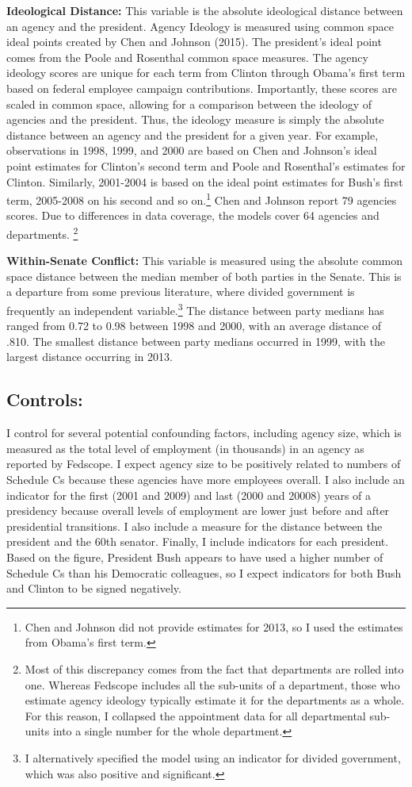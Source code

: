 \documentclass[12pt]{article}
\begin{document}
\textbf{Ideological Distance:} This variable is the absolute ideological distance between an agency and the president. Agency Ideology is measured using common space ideal points created by Chen and Johnson (2015). The president's ideal point comes from the Poole and Rosenthal common space measures. The agency ideology scores are unique for each term from Clinton through Obama's first term based on federal employee campaign contributions. Importantly, these scores are scaled in common space, allowing for a comparison between the ideology of agencies and the president. Thus, the ideology measure is simply the absolute distance between an agency and the president for a given year. For example, observations in 1998, 1999, and 2000 are based on Chen and Johnson's ideal point estimates for Clinton's second term and Poole and Rosenthal's estimates for Clinton. Similarly, 2001-2004 is based on the ideal point estimates for Bush's first term, 2005-2008 on his second and so on.\footnote{Chen and Johnson did not provide estimates for 2013, so I used the estimates from Obama's first term.} Chen and Johnson report 79 agencies scores. Due to differences in data coverage, the models cover 64 agencies and departments. \footnote{Most of this discrepancy comes from the fact that departments are rolled into one. Whereas Fedscope includes all the sub-units of a department, those who estimate agency ideology typically estimate it for the departments as a whole. For this reason, I collapsed the appointment data for all departmental sub-units into a single number for the whole department.}

\noindent \textbf{Within-Senate Conflict:} This variable is measured using the absolute common space distance between the median member of both parties in the Senate. This is a departure from some previous literature, where divided government is frequently an independent variable.\footnote{I alternatively specified the model using an indicator for divided government, which was also positive and significant.} The distance between party medians has ranged from 0.72 to 0.98 between 1998 and 2000, with an average distance of .810. The smallest distance between party medians occurred in 1999, with the largest distance occurring in 2013. 

\subsection*{Controls:}
I control for several potential confounding factors, including agency size, which is measured as the total level of employment (in thousands) in an agency as reported by Fedscope. I expect agency size to be positively related to numbers of Schedule Cs because these agencies have more employees overall. I also include an indicator for the first (2001 and 2009) and last (2000 and 20008) years of a presidency because overall levels of employment are lower just before and after presidential transitions. I also include a measure for the distance between the president and the 60th senator. Finally, I include indicators for each president. Based on the figure, President Bush appears to have used a higher number of Schedule Cs than his Democratic colleagues, so I expect indicators for both Bush and Clinton to be signed negatively. 
\end{document}
